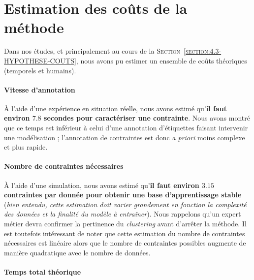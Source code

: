 	
	\newpage
	\section{Estimation des coûts de la méthode}
	\label{section:5.5-GUIDE-COUTS}
	
		Dans nos études, et principalement au cours de la \textsc{Section~\ref{section:4.3-HYPOTHESE-COUTS}}, nous avons pu estimer un ensemble de coûts théoriques (temporels et humains).
		
		
		\paragraph{\textcolor{colorSilverLakeBlue}{\faCheckSquare} Vitesse d'annotation}
			
			À l'aide d'une expérience en situation réelle, nous avons estimé qu'\textbf{il faut environ $7.8$ secondes pour caractériser une contrainte}.
			Nous avons montré que ce temps est inférieur à celui d'une annotation d'étiquettes faisant intervenir une modélisation ;
			l'annotation de contraintes est donc \textit{a priori} moins complexe et plus rapide.
		
		
		\paragraph{\textcolor{colorSilverLakeBlue}{\faCheckSquare} Nombre de contraintes nécessaires}
		
			À l'aide d'une simulation, nous avons estimé qu'\textbf{il faut environ $3.15$ contraintes par donnée pour obtenir une base d'apprentissage stable} (\textit{bien entendu, cette estimation doit varier grandement en fonction la complexité des données et la finalité du modèle à entraîner}).
			Nous rappelons qu'un expert métier devra confirmer la pertinence du \textit{clustering} avant d'arrêter la méthode.
			Il est toutefois intéressant de noter que cette estimation du nombre de contraintes nécessaires est linéaire alors que le nombre de contraintes possibles augmente de manière quadratique avec le nombre de données.
		
		
		\paragraph{\textcolor{colorSilverLakeBlue}{\faCheckSquare} Temps total théorique}
		
